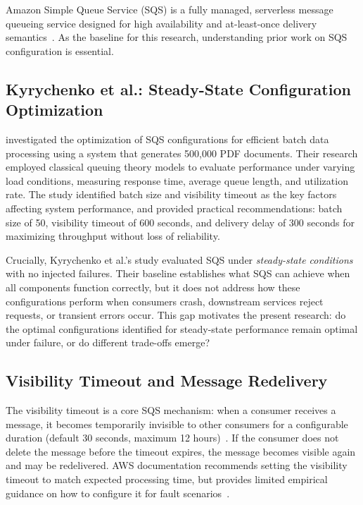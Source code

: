 Amazon Simple Queue Service (SQS) is a fully managed, serverless message queueing service designed for high availability and at-least-once delivery semantics~\citep{AWSSQSGuide}. As the baseline for this research, understanding prior work on SQS configuration is essential.

\subsection{Kyrychenko et al.: Steady-State Configuration Optimization}

\citet{Kyrychenko2025} investigated the optimization of SQS configurations for efficient batch data processing using a system that generates 500,000 PDF documents. Their research employed classical queuing theory models to evaluate performance under varying load conditions, measuring response time, average queue length, and utilization rate. The study identified batch size and visibility timeout as the key factors affecting system performance, and provided practical recommendations: batch size of 50, visibility timeout of 600 seconds, and delivery delay of 300 seconds for maximizing throughput without loss of reliability.

Crucially, Kyrychenko et al.'s study evaluated SQS under \emph{steady-state conditions} with no injected failures. Their baseline establishes what SQS can achieve when all components function correctly, but it does not address how these configurations perform when consumers crash, downstream services reject requests, or transient errors occur. This gap motivates the present research: do the optimal configurations identified for steady-state performance remain optimal under failure, or do different trade-offs emerge?

\subsection{Visibility Timeout and Message Redelivery}

The visibility timeout is a core SQS mechanism: when a consumer receives a message, it becomes temporarily invisible to other consumers for a configurable duration (default 30 seconds, maximum 12 hours)~\citep{AWSSQSGuide}. If the consumer does not delete the message before the timeout expires, the message becomes visible again and may be redelivered. AWS documentation recommends setting the visibility timeout to match expected processing time, but provides limited empirical guidance on how to configure it for fault scenarios~\citep{AWSResilience2023}.

